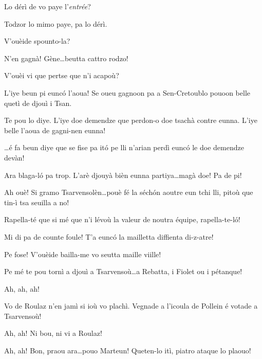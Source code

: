 \begin{drama}
\Dorinaspeaks{} Lo dérì de vo paye l'\textit{entrée}?

\Djouiyaoudouspeaks Todzor lo mimo paye, pa lo dérì.


\Genespeaks{} V'ouèide spounto-la?

\Djouiyaoueunspeaks N'en gagnà! Gène\ldots beutta cattro rodzo!

\Djouiyaoueunspeaks{} V'ouèi vi que pertse que n’i acapoù?

\Djouiyaoudouspeaks L'iye beun pi eunc\'o l'aoua! Se oueu gagnoon pa a Sen-Cretoublo pouoon belle quetì de djouì i Tsan.


\Selmospeaks	Te pou lo diye. L'iye doe demendze que perdon-o doe tsachà contre eunna. L'iye belle l'aoua de gagni-nen eunna!

\Djouiyaoueunspeaks{} \ldots é fa beun diye que se fise pa it\'o pe lli n'arian perdì eunc\'o le doe demendze devàn!

\Djouiyaoudouspeaks Ara blaga-l\'o pa trop. L’arè djouyà bièn eunna partiya\ldots magà doe! Pa de pi!

\Selmospeaks Ah ouè!  Si gramo Tsarvensolèn\ldots pouè fé la séch\'on aoutre eun tchi lli, pitoù que tin-ì tsa seuilla a no!

\Marteunspeaks  Rapella-té que si mé que n’i lévoù la valeur de noutra équipe, rapella-te-l\'o!

\Selmospeaks Mi di pa de counte foule! T'a eunc\'o la mailletta diffienta di-z-atre!

\Marteunspeaks Pe fose! V'ouèide bailla-me vo seutta maille viille!

\Djouiyaoudouspeaks{} Pe mé te pou tornì a djouì a Tsarvensoù\ldots a Rebatta, i Fiolet ou i pétanque!

\Selmospeaks Ah, ah, ah!

\Djouiyaoueunspeaks Vo de Roulaz n'en jamì si ioù vo plachì. Vegnade a l'icoula de Pollein é votade a Tsarvensoù!

\Djouiyaoudouspeaks Ah, ah! Ni bou, ni vi a Roulaz!

\Selmospeaks Ah, ah!  Bon, praou ara\ldots pouo Marteun! Queten-lo itì, piatro ataque lo plaouo!


\end{drama}
